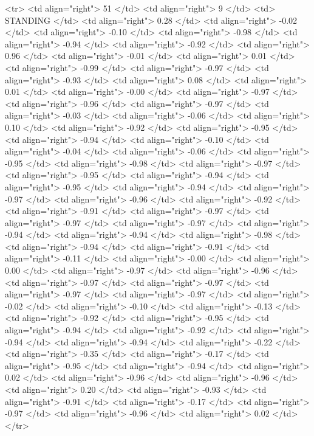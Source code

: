   <tr> <td align="right"> 51 </td> <td align="right">   9 </td> <td> STANDING </td> <td align="right"> 0.28 </td> <td align="right"> -0.02 </td> <td align="right"> -0.10 </td> <td align="right"> -0.98 </td> <td align="right"> -0.94 </td> <td align="right"> -0.92 </td> <td align="right"> 0.96 </td> <td align="right"> -0.01 </td> <td align="right"> 0.01 </td> <td align="right"> -0.99 </td> <td align="right"> -0.97 </td> <td align="right"> -0.93 </td> <td align="right"> 0.08 </td> <td align="right"> 0.01 </td> <td align="right"> -0.00 </td> <td align="right"> -0.97 </td> <td align="right"> -0.96 </td> <td align="right"> -0.97 </td> <td align="right"> -0.03 </td> <td align="right"> -0.06 </td> <td align="right"> 0.10 </td> <td align="right"> -0.92 </td> <td align="right"> -0.95 </td> <td align="right"> -0.94 </td> <td align="right"> -0.10 </td> <td align="right"> -0.04 </td> <td align="right"> -0.06 </td> <td align="right"> -0.95 </td> <td align="right"> -0.98 </td> <td align="right"> -0.97 </td> <td align="right"> -0.95 </td> <td align="right"> -0.94 </td> <td align="right"> -0.95 </td> <td align="right"> -0.94 </td> <td align="right"> -0.97 </td> <td align="right"> -0.96 </td> <td align="right"> -0.92 </td> <td align="right"> -0.91 </td> <td align="right"> -0.97 </td> <td align="right"> -0.97 </td> <td align="right"> -0.97 </td> <td align="right"> -0.94 </td> <td align="right"> -0.94 </td> <td align="right"> -0.98 </td> <td align="right"> -0.94 </td> <td align="right"> -0.91 </td> <td align="right"> -0.11 </td> <td align="right"> -0.00 </td> <td align="right"> 0.00 </td> <td align="right"> -0.97 </td> <td align="right"> -0.96 </td> <td align="right"> -0.97 </td> <td align="right"> -0.97 </td> <td align="right"> -0.97 </td> <td align="right"> -0.97 </td> <td align="right"> -0.02 </td> <td align="right"> -0.10 </td> <td align="right"> -0.13 </td> <td align="right"> -0.92 </td> <td align="right"> -0.95 </td> <td align="right"> -0.94 </td> <td align="right"> -0.92 </td> <td align="right"> -0.94 </td> <td align="right"> -0.94 </td> <td align="right"> -0.22 </td> <td align="right"> -0.35 </td> <td align="right"> -0.17 </td> <td align="right"> -0.95 </td> <td align="right"> -0.94 </td> <td align="right"> 0.02 </td> <td align="right"> -0.96 </td> <td align="right"> -0.96 </td> <td align="right"> 0.20 </td> <td align="right"> -0.93 </td> <td align="right"> -0.91 </td> <td align="right"> -0.17 </td> <td align="right"> -0.97 </td> <td align="right"> -0.96 </td> <td align="right"> 0.02 </td> </tr>
